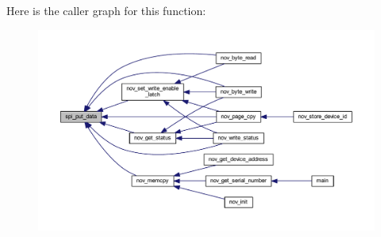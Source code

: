 Here is the caller graph for this function\+:
\nopagebreak
\begin{figure}[H]
\begin{center}
\leavevmode
\includegraphics[width=350pt]{dc/d87/a00032_a19e2dff580e4d1b2198fa9108fca81ac_icgraph}
\end{center}
\end{figure}


